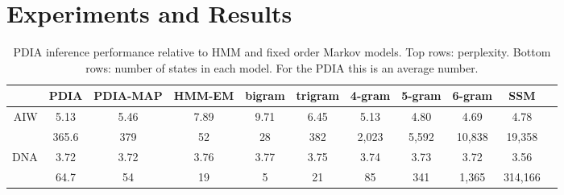 \section{Experiments and Results}
\label{sec:results}


\begin{table}[t]
    \begin{center}
    \setlength{\tabcolsep}{1.3mm}
\begin{tabular}{r|cccccccccc}
\hline
& PDIA  & PDIA-MAP &  HMM-EM & bigram& trigram & 4-gram & 5-gram & 6-gram & SSM \\
\hline
AIW & 5.13 & 5.46 &  7.89 & 9.71 & 6.45 & 5.13 & 4.80 & 4.69 & 4.78 \\
  & 365.6 & 379 & 52 & 28 & 382 & 2,023 & 5,592 & 10,838 & 19,358 \\
\hline
\hline
DNA & 3.72 & 3.72 &  3.76 & 3.77 & 3.75 & 3.74 & 3.73 & 3.72 & 3.56 \\
 & 64.7 & 54 & 19 &  5 & 21 & 85 & 341 & 1,365 & 314,166 \\
\hline
\end{tabular}
\end{center}
\caption[Short]{PDIA inference performance relative to HMM and fixed order Markov models.  Top rows: perplexity.  Bottom rows: number of states in each model.  For the PDIA this is an average number.\label{table:results}}
\end{table}


